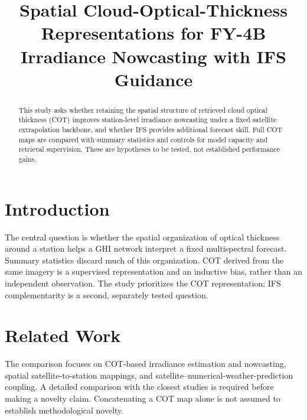 \documentclass[11pt]{article}
\title{Spatial Cloud-Optical-Thickness Representations for FY-4B Irradiance Nowcasting with IFS Guidance}
\author{}
\date{}
\begin{document}
\maketitle
\begin{abstract}
This study asks whether retaining the spatial structure of retrieved cloud optical thickness (COT) improves station-level irradiance nowcasting under a fixed satellite extrapolation backbone, and whether IFS provides additional forecast skill. Full COT maps are compared with summary statistics and controls for model capacity and retrieval supervision. These are hypotheses to be tested, not established performance gains.
\end{abstract}
\section{Introduction}
The central question is whether the spatial organization of optical thickness around a station helps a GHI network interpret a fixed multispectral forecast. Summary statistics discard much of this organization. COT derived from the same imagery is a supervised representation and an inductive bias, rather than an independent observation. The study prioritizes the COT representation; IFS complementarity is a second, separately tested question.
\section{Related Work}
The comparison focuses on COT-based irradiance estimation and nowcasting, spatial satellite-to-station mappings, and satellite--numerical-weather-prediction coupling. A detailed comparison with the closest studies is required before making a novelty claim. Concatenating a COT map alone is not assumed to establish methodological novelty.
\end{document}
